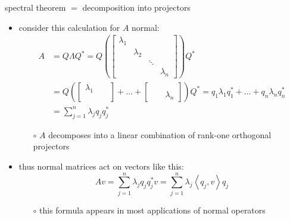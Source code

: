 \documentclass[10pt,hyperref]{beamer}
\newcommand{\ip}[2]{\left<#1,#2\right>}
\begin{document}
\begin{frame}{spectral theorem $=$ decomposition into projectors}

\begin{itemize}
\item consider this calculation for $A$ normal:
\small
\begin{align*}
A &= Q\Lambda Q^* = Q \left(\begin{bmatrix} \lambda_1 & & & \\ & \lambda_2 & & \\ & & \ddots & \\ & & & \lambda_n \end{bmatrix}\right) Q^* \\
  &= Q \left(\begin{bmatrix} \lambda_1 & & \\ & & \\ & & \end{bmatrix} + \dots + \begin{bmatrix} & & \\ & & \\ & & \lambda_n \end{bmatrix}\right) Q^* = q_1 \lambda_1 q_1^* + \dots + q_n \lambda_n q_n^* \\
  &= \sum_{j=1}^n \lambda_j q_j q_j^*
\end{align*}
\normalsize

    \vspace{-2mm}
    \begin{itemize}
    \item[$\circ$] $A$ decomposes into a linear combination of rank-one orthogonal projectors
    \end{itemize}

\medskip
\item thus normal matrices act on vectors like this:
    $$A v = \sum_{j=1}^n \lambda_j q_j q_j^*v = \sum_{j=1}^n \lambda_j \ip{q_j}{v} q_j$$

    \vspace{-2mm}
    \begin{itemize}
    \item[$\circ$] this formula appears in most applications of normal operators
    \end{itemize}
\end{itemize}
\end{frame}
\end{document}
